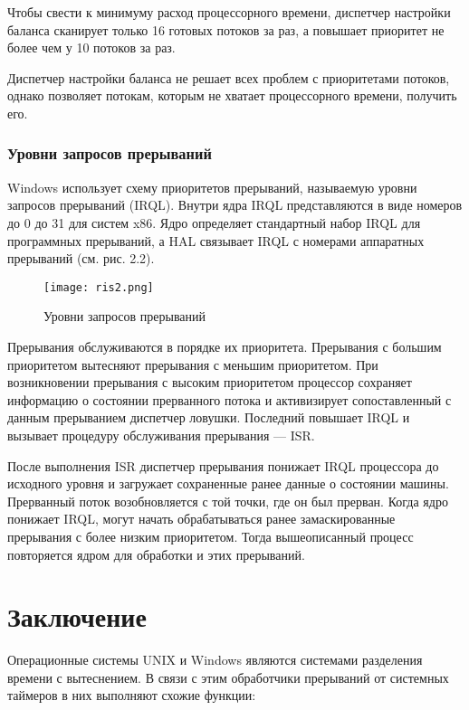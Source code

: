 \documentclass[12pt]{report}
\begin{document}
Чтобы свести к минимуму расход процессорного времени, диспетчер настройки баланса сканирует только 16 готовых потоков за раз, а повышает приоритет не более чем у 10 потоков за раз.

Диспетчер настройки баланса не решает всех проблем с
приоритетами потоков, однако позволяет потокам, которым не хватает процессорного времени, получить его.

\subsection{Уровни запросов прерываний}
Windows использует схему приоритетов прерываний, называемую уровни запросов прерываний (IRQL). Внутри ядра IRQL представляются в виде номеров до 0 до 31 для систем x86. Ядро определяет стандартный набор IRQL для программных прерываний, а HAL связывает IRQL с номерами аппаратных прерываний (см. рис. 2.2).

\begin{figure}[h]
	\centering
	{\texttt{[image: ris2.png]}} 
	\caption{Уровни запросов прерываний}
	\label{ris2}
\end{figure}

Прерывания обслуживаются в порядке их приоритета. Прерывания с большим приоритетом вытесняют прерывания с меньшим приоритетом.
При возникновении прерывания с высоким приоритетом процессор сохраняет информацию о состоянии прерванного потока и активизирует сопоставленный с данным прерыванием диспетчер ловушки. Последний повышает IRQL и вызывает процедуру обслуживания прерывания — ISR.

После выполнения ISR диспетчер прерывания понижает IRQL процессора до исходного уровня и загружает сохраненные ранее данные о состоянии машины. Прерванный поток возобновляется с той точки, где он был прерван. Когда ядро понижает IRQL, могут начать обрабатываться ранее замаскированные прерывания с более низким приоритетом. Тогда вышеописанный процесс повторяется ядром для обработки и этих прерываний.

\chapter{Заключение}
Операционные системы UNIX и Windows являются системами разделения времени с вытеснением. В связи с этим обработчики прерываний от системных таймеров в них выполняют схожие
функции:
\end{document}
